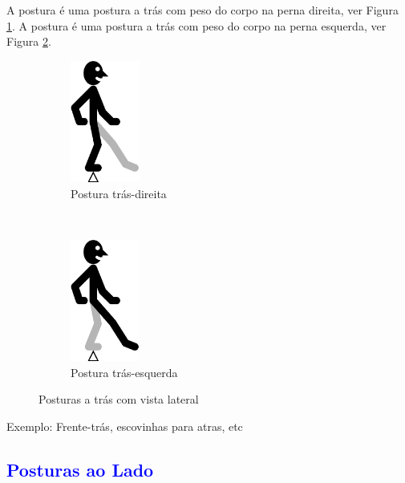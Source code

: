 A postura  é uma postura a trás com peso do corpo na perna direita, ver Figura \ref{fig:trasdireita}.
A postura  é uma postura a trás com peso do corpo na perna esquerda, ver Figura \ref{fig:trasesquerda}.
\begin{figure}[H]
    \centering
    \begin{subfigure}[b]{0.3\textwidth}
        \includegraphics[height=4cm]{chapters/cap-posturas/postura-ft-tras-der.eps}
        \caption{Postura trás-direita}
        \label{fig:trasdireita}
    \end{subfigure}
    ~ %
    \begin{subfigure}[b]{0.3\textwidth}
        \includegraphics[height=4cm]{chapters/cap-posturas/postura-ft-tras-esq.eps}
        \caption{Postura trás-esquerda}
        \label{fig:trasesquerda}
    \end{subfigure}
    \caption{Posturas a trás  com vista lateral}\label{fig:trasderesq}
\end{figure}

Exemplo: Frente-trás, escovinhas para atras, etc

\subsection{\textcolor{blue}{ Posturas ao Lado}}

